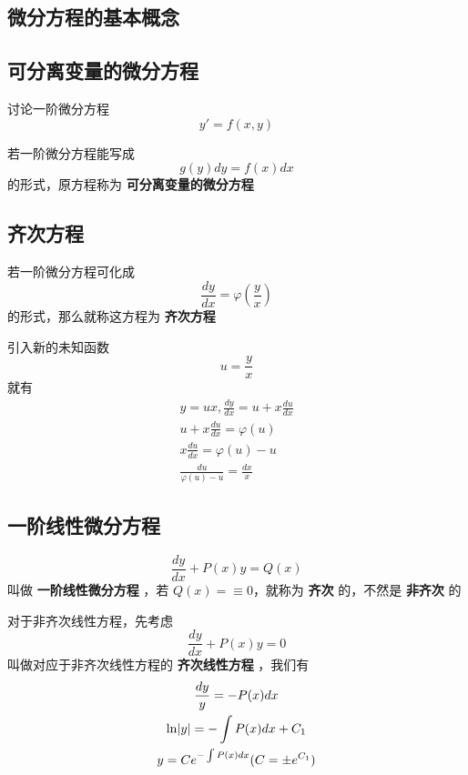 \documentclass[11pt]{article}
\begin{document}
\subsection{微分方程的基本概念}
\label{sec:org0363e46}
\subsection{可分离变量的微分方程}
\label{sec:orgf8a183e}
讨论一阶微分方程
\begin{equation*}
y'=f(x,y)
\end{equation*}

若一阶微分方程能写成
\begin{equation*}
g(y)dy=f(x)dx
\end{equation*}
的形式，原方程称为 \textbf{可分离变量的微分方程}
\subsection{齐次方程}
\label{sec:orgad68b93}
若一阶微分方程可化成
\begin{equation*}
\frac{dy}{dx}=\varphi(\frac{y}{x})
\end{equation*}
的形式，那么就称这方程为 \textbf{齐次方程}

引入新的未知函数
\begin{equation*}
u=\frac{y}{x}
\end{equation*}
就有
\begin{gather*}
y=ux,\frac{dy}{dx}=u+x\frac{du}{dx}\\
u+x\frac{du}{dx}=\varphi(u)\\
x\frac{du}{dx}=\varphi(u)-u\\
\frac{du}{\varphi(u)-u}=\frac{dx}{x}
\end{gather*}
\subsection{一阶线性微分方程}
\label{sec:orgf95fe9d}
\begin{equation*}
\frac{dy}{dx}+P(x)y=Q(x)
\end{equation*}
叫做 \textbf{一阶线性微分方程} ，若 \(Q(x)=\equiv0\)，就称为  \textbf{齐次} 的，不然是 \textbf{非齐次}
的

对于非齐次线性方程，先考虑
\begin{equation*}
\frac{dy}{dx}+P(x)y=0
\end{equation*}
叫做对应于非齐次线性方程的 \textbf{齐次线性方程} ，我们有
\begin{gather*}
\frac{dy}{y}=-P(x)dx\\
\ln\abs{y}=-\int P(x)dx+C_1\\
y=Ce^{-\int P(x)dx}(C=\pm e^{C_1})
\end{gather*}
\end{document}
